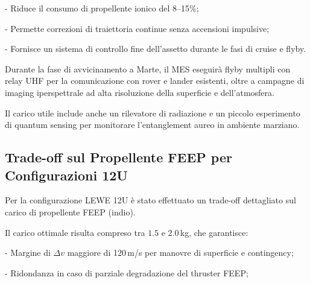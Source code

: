 \documentclass[11pt,a4paper]{article}
\theoremstyle{plain}
\theoremstyle{definition}
\begin{document}
\vspace{0.1cm}


- Riduce il consumo di propellente ionico del 8–15\%;

\vspace{0.1cm}

- Permette correzioni di traiettoria continue senza accensioni impulsive;


\vspace{0.1cm}

- Fornisce un sistema di controllo fine dell’assetto durante le fasi di cruise e flyby.

\vspace{0.3cm}

Durante la fase di avvicinamento a Marte, il MES eseguirà flyby multipli con relay UHF per la comunicazione con rover e lander esistenti, oltre a campagne di imaging iperspettrale ad alta risoluzione della superficie e dell’atmosfera. 


\vspace{0.2cm}

Il carico utile include anche un rilevatore di radiazione e un piccolo esperimento di quantum sensing per monitorare l’entanglement aureo in ambiente marziano.






\subsection{Trade-off sul Propellente FEEP per Configurazioni 12U}

\vspace{0.2cm}

Per la configurazione LEWE 12U è stato effettuato un trade-off dettagliato sul carico di propellente FEEP (indio). 

\vspace{0.2cm}


Il carico ottimale risulta compreso tra $1.5$ e $2.0$\,kg, che garantisce:

\vspace{0.1cm}


- Margine di $\Delta v$ maggiore di 120\,m/s per manovre di superficie e contingency;


\vspace{0.1cm}

- Ridondanza in caso di parziale degradazione del thruster FEEP;

\vspace{0.1cm}
\end{document}
